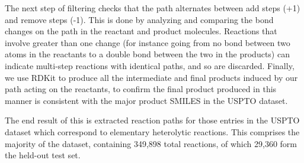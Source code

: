 The next step of filtering checks that the path alternates between add steps (+1) and remove steps (-1). 
This is done by analyzing and comparing the bond changes on the path in the reactant and product molecules. 
Reactions that involve greater than one change (for instance going from no bond between two atoms in the reactants to a double bond between the two in the products) can indicate multi-step 
reactions with identical paths, and so are discarded.
Finally, we use RDKit to produce all the intermediate and final products induced by our path acting on the reactants,
to confirm the final product produced in this manner is consistent with the major product SMILES in the USPTO dataset.

The end result of this is extracted reaction paths for those entries in the USPTO dataset which 
correspond to elementary heterolytic reactions.
This comprises the majority of the dataset, containing 349,898 total reactions, of which 29,360 form the held-out test set.


